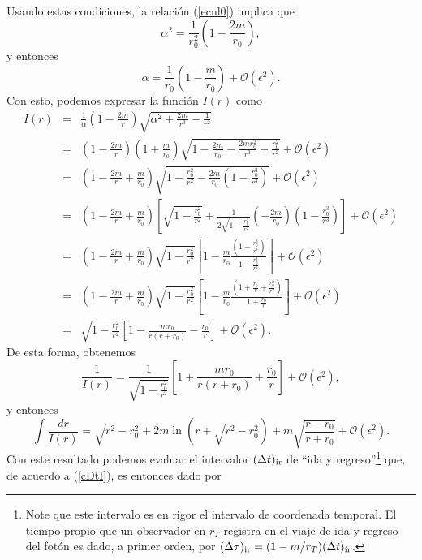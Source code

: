 Usando estas condiciones, la relación (\ref{ecul0}) implica que
\begin{equation}
 \alpha^2=\frac{1}{r^2_0}\left(1-\frac{2m}{r_0}\right),
\end{equation}
y entonces
\begin{equation}
\alpha=\frac{1}{r_0}\left(1-\frac{m}{r_0}\right)+\mathcal{O}(\epsilon^2).
\end{equation}
Con esto, podemos expresar la función $I(r)$ como
\begin{eqnarray}
 I(r)&=&\frac{1}{\alpha}\left(1-\frac{2m}{r}\right)\sqrt{\alpha^2+\frac{2m}{r^3}-\frac{1}{r^2}} \\
&=&\left(1-\frac{2m}{r}\right)\left(1+\frac{m}{r_0}\right)\sqrt{1-\frac{2m}{r_0}-\frac{2mr_0^2}{r^3}-\frac{r_0^2}{r^2}} +\mathcal{O}(\epsilon^2)\\
&=&\left(1-\frac{2m}{r}+\frac{m}{r_0}\right)\sqrt{1-\frac{r_0^2}{r^2}-\frac{2m}{r_0}\left(1-\frac{r_0^3}{r^3}\right)}+\mathcal{O}(\epsilon^2) \\
&=&\left(1-\frac{2m}{r}+\frac{m}{r_0}\right)\left[\sqrt{1-\frac{r_0^2}{r^2}}+\frac{1}{2\sqrt{1-\frac{r_0^2}{r^2}}}\left(-\frac{2m}{r_0}\right)\left(1-\frac{r_0^3}{r^3}\right)\right] +\mathcal{O}(\epsilon^2)\\
&=&\left(1-\frac{2m}{r}+\frac{m}{r_0}\right)\sqrt{1-\frac{r_0^2}{r^2}}\left[1-\frac{m}{r_0}\frac{\left(1-\frac{r_0^3}{r^3}\right)}{1-\frac{r_0^2}{r^2}}\right] +\mathcal{O}(\epsilon^2)\\
&=&\left(1-\frac{2m}{r}+\frac{m}{r_0}\right)\sqrt{1-\frac{r_0^2}{r^2}}\left[1-\frac{m}{r_0}\frac{\left(1+\frac{r_0}{r}+\frac{r_0^2}{r^2}\right)}{1+\frac{r_0}{r}}\right]+\mathcal{O}(\epsilon^2) \\
&=&\sqrt{1-\frac{r_0^2}{r^2}}\left[1-\frac{mr_0}{r(r+r_0)}-\frac{r_0}{r}\right]+\mathcal{O}(\epsilon^2).
\end{eqnarray}
De esta forma, obtenemos
\begin{equation}
 \frac{1}{I(r)}=\frac{1}{\sqrt{1-\frac{r_0^2}{r^2}}}\left[1+\frac{mr_0}{r(r+r_0)}+\frac{r_0}{r}\right]+\mathcal{O}(\epsilon^2),
\end{equation}
y entonces
\begin{equation}
 \int\frac{dr}{I(r)}=\sqrt{r^2-r_0^2}+2m\ln\left(r+\sqrt{r^2-r_0^2}\right)+m\sqrt{\frac{r-r_0}{r+r_0}}+\mathcal{O}(\epsilon^2).
\end{equation}
Con este resultado podemos evaluar el intervalor $(\Delta t)_{\rm ir}$ de ``ida y regreso''\footnote{Note que este intervalo es en rigor el intervalo de coordenada temporal. El tiempo propio que un observador en $r_T$ registra en el viaje de ida y regreso del fotón es dado, a primer orden, por $(\Delta\tau)_{\rm ir}=(1-m/r_T)(\Delta t)_{\rm ir}$.} que, de acuerdo a (\ref{cDtI}), es entonces dado por
